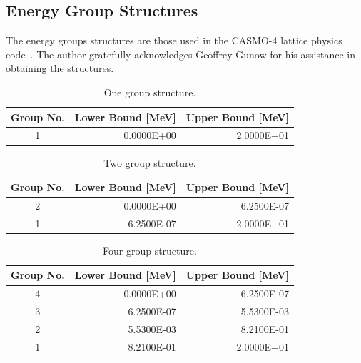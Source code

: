 \begin{appendices}

\chapter{Energy Group Structures}
\label{app:energy-groups}

The energy groups structures are those used in the CASMO-4 lattice physics code~\cite{edenius1995casmo}. The author gratefully acknowledges Geoffrey Gunow for his assistance in obtaining the structures.

\renewcommand{\arraystretch}{0.8}%

\begin{table}[h!]
  \centering
  \footnotesize
  \caption{One group structure.}
  \label{table:app-1-groups} 
  \vspace{14pt}
  \begin{tabular}{c r r}
    \toprule
    {\bf Group No.} &
    {\bf Lower Bound [MeV]} &
    {\bf Upper Bound [MeV]} \\
    \midrule
1 & 0.0000E+00 & 2.0000E+01 \\
    \bottomrule
   \end{tabular}
\end{table}

\begin{table}[h!]
  \centering
  \footnotesize
  \caption{Two group structure.}
  \label{table:app-2-groups} 
  \vspace{14pt}
  \begin{tabular}{c r r}
    \toprule
    {\bf Group No.} &
    {\bf Lower Bound [MeV]} &
    {\bf Upper Bound [MeV]} \\
    \midrule
2 & 0.0000E+00 & 6.2500E-07 \\
1 & 6.2500E-07 & 2.0000E+01 \\
  \bottomrule
 \end{tabular}
\end{table}

\begin{table}[h!]
  \centering
  \footnotesize
  \caption{Four group structure.}
  \label{table:app-4-groups} 
  \vspace{14pt}
  \begin{tabular}{c r r}
    \toprule
    {\bf Group No.} &
    {\bf Lower Bound [MeV]} &
    {\bf Upper Bound [MeV]} \\
    \midrule
4 & 0.0000E+00 & 6.2500E-07 \\
3 & 6.2500E-07 & 5.5300E-03 \\
2 & 5.5300E-03 & 8.2100E-01 \\
1 & 8.2100E-01 & 2.0000E+01 \\
  \bottomrule
 \end{tabular}
\end{table}


\end{appendices}
